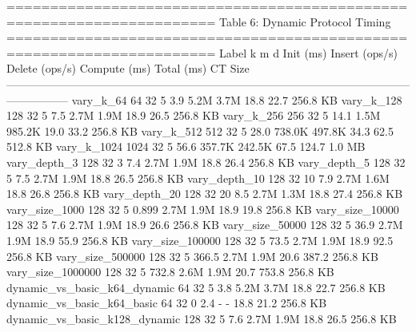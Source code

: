 ======================================================================
  Table 6: Dynamic Protocol Timing
======================================================================
                           Label     k   m   d  Init (ms)  Insert (ops/s)  Delete (ops/s)  Compute (ms)  Total (ms)   CT Size
-----------------------------------------------------------------------------------------------------------------------------
                       vary_k_64    64  32   5        3.9            5.2M            3.7M          18.8        22.7  256.8 KB
                      vary_k_128   128  32   5        7.5            2.7M            1.9M          18.9        26.5  256.8 KB
                      vary_k_256   256  32   5       14.1            1.5M          985.2K          19.0        33.2  256.8 KB
                      vary_k_512   512  32   5       28.0          738.0K          497.8K          34.3        62.5  512.8 KB
                     vary_k_1024  1024  32   5       56.6          357.7K          242.5K          67.5       124.7    1.0 MB
                    vary_depth_3   128  32   3        7.4            2.7M            1.9M          18.8        26.4  256.8 KB
                    vary_depth_5   128  32   5        7.5            2.7M            1.9M          18.8        26.5  256.8 KB
                   vary_depth_10   128  32  10        7.9            2.7M            1.6M          18.8        26.8  256.8 KB
                   vary_depth_20   128  32  20        8.5            2.7M            1.3M          18.8        27.4  256.8 KB
                  vary_size_1000   128  32   5      0.899            2.7M            1.9M          18.9        19.8  256.8 KB
                 vary_size_10000   128  32   5        7.6            2.7M            1.9M          18.9        26.6  256.8 KB
                 vary_size_50000   128  32   5       36.9            2.7M            1.9M          18.9        55.9  256.8 KB
                vary_size_100000   128  32   5       73.5            2.7M            1.9M          18.9        92.5  256.8 KB
                vary_size_500000   128  32   5      366.5            2.7M            1.9M          20.6       387.2  256.8 KB
               vary_size_1000000   128  32   5      732.8            2.6M            1.9M          20.7       753.8  256.8 KB
    dynamic_vs_basic_k64_dynamic    64  32   5        3.8            5.2M            3.7M          18.8        22.7  256.8 KB
      dynamic_vs_basic_k64_basic    64  32   0        2.4               -               -          18.8        21.2  256.8 KB
   dynamic_vs_basic_k128_dynamic   128  32   5        7.6            2.7M            1.9M          18.8        26.5  256.8 KB
